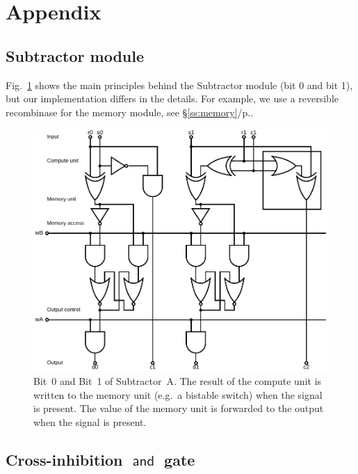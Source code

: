 \documentclass[12pt,notitlepage]{article}
\newcommand{\AND}{\ensuremath{\mathop{\mathsf{and}}}\xspace}
\begin{document}
\clearpage



\section*{Appendix}

\subsection{Subtractor module}

Fig.~\ref{f:logical-subtractor01} 
shows the main principles
behind 
the Subtractor module (bit 0 and bit 1),
but our implementation
differs in the details.
%
For example, we use a reversible recombinase
for the memory module, see \S\ref{ss:memory}/p.\pageref{ss:memory}.

\begin{figure}[phbt]
\centering
\includegraphics[width=0.9\linewidth]{circuits/Logical-HalfSubtractor0.svg.pdf}
\caption{%
Bit~0 and Bit~1
of
Subtractor~A.
%
The result of the compute unit is written to the memory unit
(e.g.~a bistable switch)
when the signal  is present.
%
The value of the memory unit is
forwarded to the output
when the signal  is present.
}
\label{f:logical-subtractor01}
\end{figure}




\subsection{Cross-inhibition \AND gate} \label{s:x-inh}
\end{document}
